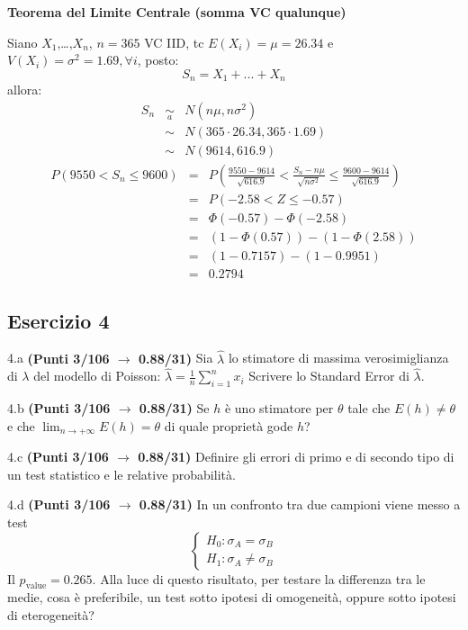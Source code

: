 \documentclass[
  11pt,
]{book}
\theoremstyle{mytheoremstyle}
\theoremstyle{mydefstyle}
\newenvironment{sol}
  {
  \begin{tcolorbox}[enhanced,breakable,arc=0.1mm,boxrule=1pt,colback=white,colframe=iblue,
  title=\bf \fontfamily{lmss}\selectfont \hspace{.5 cm} Soluzione,drop fuzzy shadow]

}{
\end{tcolorbox}
  }
\begin{document}
\begin{sol}
\textbf{Teorema del Limite Centrale (somma VC qualunque)}

Siano \(X_1\),\ldots,\(X_n\), \(n=365\) VC IID, tc \(E(X_i)=\mu=26.34\) e \(V(X_i)=\sigma^2=1.69,\forall i\), posto:
\[
      S_n = X_1 + ... + X_n
      \]
allora:\begin{eqnarray*}
  S_n & \mathop{\sim}\limits_{a}& N(n\mu,n\sigma^2) \\
     &\sim & N(365\cdot26.34,365\cdot1.69) \\
     &\sim & N(9614,616.9) 
  \end{eqnarray*}\begin{eqnarray*}
   P( 9550 < S_n \leq  9600 ) &=& P\left( \frac { 9550  -  9614 }{\sqrt{ 616.9 }} < \frac { S_n  -  n\mu }{ \sqrt{n\sigma^2} } \leq \frac { 9600  -  9614 }{\sqrt{ 616.9 }}\right)  \\
              &=& P\left(  -2.58  < Z \leq  -0.57 \right) \\
              &=& \Phi( -0.57 )-\Phi( -2.58 )\\
              &=&  (1-\Phi( 0.57 ))-(1-\Phi( 2.58 )) \\ &=& (1- 0.7157 )-(1- 0.9951 ) \\ 
              &=&  0.2794 
   \end{eqnarray*}

\end{sol}

\subsection{Esercizio 4}\label{esercizio-4-12}

4.a \textbf{(Punti 3/106 \(\rightarrow\) 0.88/31)} Sia \(\hat \lambda\) lo stimatore di massima verosimiglianza di \(\lambda\) del modello di Poisson: \(\hat\lambda =  \frac 1n\sum_{i=1}^nx_i\)
Scrivere lo Standard Error di \(\hat \lambda\).

4.b \textbf{(Punti 3/106 \(\rightarrow\) 0.88/31)} Se \(h\) è uno stimatore per \(\theta\) tale che
\(E(h)\ne \theta\) e che \(\lim_ {n\to +\infty}E(h)=\theta\) di quale proprietà gode \(h\)?

4.c \textbf{(Punti 3/106 \(\rightarrow\) 0.88/31)} Definire gli errori di primo e di secondo tipo di un test statistico e le relative probabilità.

4.d \textbf{(Punti 3/106 \(\rightarrow\) 0.88/31)} In un confronto tra due campioni viene messo a test
\[
\begin{cases}
H_0:\sigma_A=\sigma_B\\
H_1:\sigma_A\ne \sigma_B
\end{cases}
\]
Il \(p_\text{value}=0.265\). Alla luce di questo risultato, per testare la differenza tra le medie, cosa è preferibile, un test sotto ipotesi di omogeneità, oppure sotto ipotesi di eterogeneità?
\end{document}
